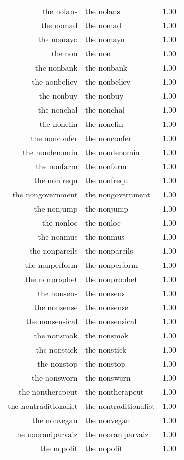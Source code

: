 \begin{table}[ht]
\begin{tabular}{rlr}
  the nolans & the nolans & 1.00 \\ 
  the nomad & the nomad & 1.00 \\ 
  the nomayo & the nomayo & 1.00 \\ 
  the non & the non & 1.00 \\ 
  the nonbank & the nonbank & 1.00 \\ 
  the nonbeliev & the nonbeliev & 1.00 \\ 
  the nonbuy & the nonbuy & 1.00 \\ 
  the nonchal & the nonchal & 1.00 \\ 
  the nonclin & the nonclin & 1.00 \\ 
  the nonconfer & the nonconfer & 1.00 \\ 
  the nondenomin & the nondenomin & 1.00 \\ 
  the nonfarm & the nonfarm & 1.00 \\ 
  the nonfrequ & the nonfrequ & 1.00 \\ 
  the nongovernment & the nongovernment & 1.00 \\ 
  the nonjump & the nonjump & 1.00 \\ 
  the nonloc & the nonloc & 1.00 \\ 
  the nonmus & the nonmus & 1.00 \\ 
  the nonpareils & the nonpareils & 1.00 \\ 
  the nonperform & the nonperform & 1.00 \\ 
  the nonprophet & the nonprophet & 1.00 \\ 
  the nonsens & the nonsens & 1.00 \\ 
  the nonsense & the nonsense & 1.00 \\ 
  the nonsensical & the nonsensical & 1.00 \\ 
  the nonsmok & the nonsmok & 1.00 \\ 
  the nonstick & the nonstick & 1.00 \\ 
  the nonstop & the nonstop & 1.00 \\ 
  the nonsworn & the nonsworn & 1.00 \\ 
  the nontherapeut & the nontherapeut & 1.00 \\ 
  the nontraditionalist & the nontraditionalist & 1.00 \\ 
  the nonvegan & the nonvegan & 1.00 \\ 
  the nooraniparvaiz & the nooraniparvaiz & 1.00 \\ 
  the nopolit & the nopolit & 1.00 \\ 

\end{tabular}
\end{table}
